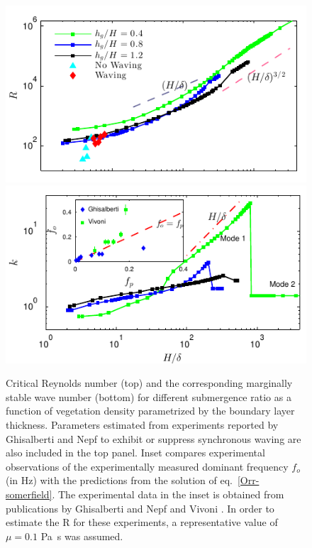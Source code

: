 \documentclass[aps,prl,twocolumn,superscriptaddress,10pt]{revtex4-1}  %
\newcommand{\Rey}{\text{R}}
\begin{document}
\begin{figure}
\begin{center}
\includegraphics[]{Critical_Re_vs_delta_noshear} \\
\vspace{-6mm} \hspace{-3mm}
\includegraphics[]{K_vs_shear_width_noshear}
\end{center}
\caption{Critical Reynolds number (top) and the corresponding marginally stable wave number (bottom) for different submergence ratio as a function of vegetation density parametrized by the boundary layer thickness. 
Parameters estimated from experiments reported by Ghisalberti and Nepf \cite{Ghisal02} to exhibit or suppress synchronous waving are also included in the top panel. 
Inset compares experimental observations of the experimentally measured dominant frequency $f_o$ (in Hz) with the predictions from the solution of eq.~\eqref{Orr-somerfield}. 
The experimental data in the inset is obtained from publications by Ghisalberti and Nepf \cite{Ghisal02} and Vivoni \cite{Vivoni98}. 
In order to estimate the $\Rey$ for these experiments, a representative value of $\mu=0.1$ Pa~s was assumed.}
\label{Re_vs_delta}
\end{figure}
\end{document}
